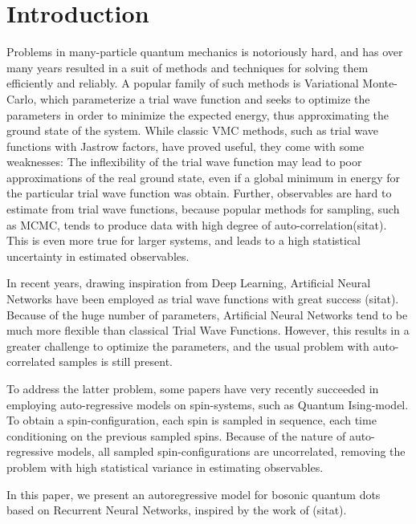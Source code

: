 \section{Introduction}

Problems in many-particle quantum mechanics is notoriously hard, and has over many years resulted in a suit of methods and techniques for solving them efficiently and reliably. A popular family of such methods is Variational Monte-Carlo, which parameterize a trial wave function and seeks to optimize the parameters in order to minimize the expected energy, thus approximating the ground state of the system. While classic VMC methods, such as trial wave functions with Jastrow factors, have proved useful, they come with some weaknesses: The inflexibility of the trial wave function may lead to poor approximations of the real ground state, even if a global minimum in energy for the particular trial wave function was obtain. Further, observables are hard to estimate from trial wave functions, because popular methods for sampling, such as MCMC, tends to produce data with high degree of auto-correlation(sitat). This is even more true for larger systems, and leads to a high statistical uncertainty in estimated observables.

In recent years, drawing inspiration from Deep Learning, Artificial Neural Networks have been employed as trial wave functions with great success (sitat). Because of the huge number of parameters, Artificial Neural Networks tend to be much more flexible than classical Trial Wave Functions. However, this results in a greater challenge to optimize the parameters, and the usual problem with auto-correlated samples is still present.

To address the latter problem, some papers have very recently succeeded in employing auto-regressive models on spin-systems, such as Quantum Ising-model. To obtain a spin-configuration, each spin is sampled in sequence, each time conditioning on the previous sampled spins. Because of the nature of auto-regressive models, all sampled spin-configurations are uncorrelated, removing the problem with high statistical variance in estimating observables.

In this paper, we present an autoregressive model for bosonic quantum dots based on Recurrent Neural Networks, inspired by the work of (sitat).

